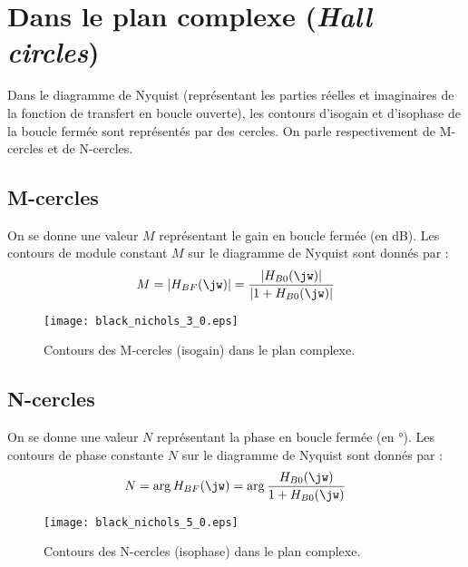 \section{Dans le plan complexe (\emph{Hall circles})}
Dans le diagramme de Nyquist (représentant les parties réelles et imaginaires de 
la fonction de transfert en boucle ouverte), les contours d'isogain et 
d'isophase de la boucle fermée sont représentés par des cercles. 
On parle respectivement de M-cercles et de N-cercles. 
\subsection{M-cercles}
On se donne une valeur $M$ représentant le gain en boucle fermée (en \si{\dB}). 
Les contours de module constant $M$ sur le diagramme de Nyquist 
sont donnés par :
\[
    M=|H_{BF}(\jw)|=\dfrac{|H_{B0}(\jw)|}{|1+H_{B0}(\jw)|}
\]
\begin{figure}[!h]
    \centering
    \texttt{[image: black\_nichols\_3\_0.eps]}
    \caption{Contours des M-cercles (isogain) dans le plan complexe.}
\end{figure}
\subsection{N-cercles}
On se donne une valeur $N$ représentant la phase en boucle fermée 
(en \si{\degree}). Les contours de phase constante $N$ sur le diagramme 
de Nyquist sont donnés par :
\[
    N=\arg{H_{BF}(\jw)}=\arg{\dfrac{H_{B0}(\jw)}{1+H_{B0}(\jw)}}
\]
\begin{figure}[!h]
    \centering
    \texttt{[image: black\_nichols\_5\_0.eps]}
    \caption{Contours des N-cercles (isophase) dans le plan complexe.}
\end{figure}
\clearpage
